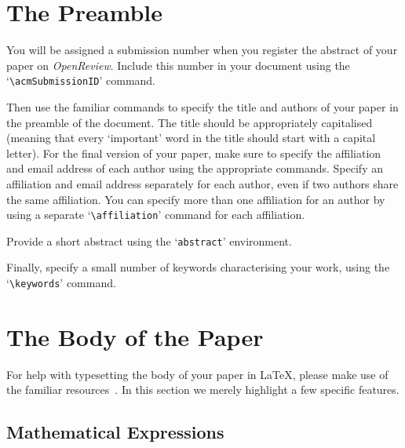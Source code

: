 \documentclass[sigconf,anonymous]{aamas}
\begin{document}

\section{The Preamble}

You will be assigned a submission number when you register the abstract 
of your paper on \textit{OpenReview}. Include this number in your 
document using the `\verb|\acmSubmissionID|' command.

Then use the familiar commands to specify the title and authors of your
paper in the preamble of the document. The title should be appropriately 
capitalised (meaning that every `important' word in the title should 
start with a capital letter). For the final version of your paper, make 
sure to specify the affiliation and email address of each author using 
the appropriate commands. Specify an affiliation and email address 
separately for each author, even if two authors share the same 
affiliation. You can specify more than one affiliation for an author by 
using a separate `\verb|\affiliation|' command for each affiliation.

Provide a short abstract using the `\texttt{abstract}' environment.
 
Finally, specify a small number of keywords characterising your work, 
using the `\verb|\keywords|' command. 


\section{The Body of the Paper}

For help with typesetting the body of your paper in \LaTeX\@, please 
make use of the familiar resources~\cite{Lam94}. In this section we 
merely highlight a few specific features. 

\subsection{Mathematical Expressions}
\end{document}
